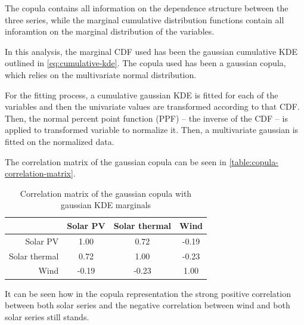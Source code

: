 The copula contains all information on the dependence structure between the three series, while the marginal cumulative distribution functions contain all inforamtion on the marginal distribution of the variables. 

In this analysis, the marginal CDF used has been the gaussian cumulative KDE outlined in \eqref{eq:cumulative-kde}. The copula used has been a gaussian copula, which relies on the multivariate normal distribution.

For the fitting process, a cumulative gaussian KDE is fitted for each of the variables and then the univariate values are transformed according to that CDF. Then, the normal percent point function (PPF) -- the inverse of the CDF -- is applied to transformed variable to normalize it. Then, a multivariate gaussian is fitted on the normalized data. 

The correlation matrix of the gaussian copula can be seen in \autoref{table:copula-correlation-matrix}.

\begin{table}[ht]
    \centering
    \begin{tabular}{r|ccc}
        & Solar PV & Solar thermal & Wind \\
        \midrule
        Solar PV & 1.00 & 0.72 & -0.19 \\
        Solar thermal & 0.72 & 1.00 & -0.23 \\
        Wind & -0.19 & -0.23 & 1.00 \\
    \end{tabular}
    \caption{Correlation matrix of the gaussian copula with gaussian KDE marginals}
    \label{table:copula-correlation-matrix}
\end{table}

It can be seen how in the copula representation the strong positive correlation between both solar series and the negative correlation between wind and both solar series still stands. 